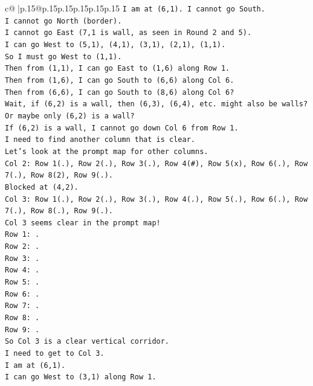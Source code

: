 \documentclass{article}
\begin{document}
{\begin{supertabular}{c@{$\;$}|p{.15\linewidth}@{}p{.15\linewidth}p{.15\linewidth}p{.15\linewidth}p{.15\linewidth}p{.15\linewidth}}
{{{\texttt{I am at (6,1). I cannot go South.} \\
\texttt{I cannot go North (border).} \\
\texttt{I cannot go East (7,1 is wall, as seen in Round 2 and 5).} \\
\texttt{I can go West to (5,1), (4,1), (3,1), (2,1), (1,1).} \\
\texttt{So I must go West to (1,1).} \\
\texttt{Then from (1,1), I can go East to (1,6) along Row 1.} \\
\texttt{Then from (1,6), I can go South to (6,6) along Col 6.} \\
\texttt{Then from (6,6), I can go South to (8,6) along Col 6?} \\
\texttt{Wait, if (6,2) is a wall, then (6,3), (6,4), etc. might also be walls?} \\
\texttt{Or maybe only (6,2) is a wall?} \\
\texttt{If (6,2) is a wall, I cannot go down Col 6 from Row 1.} \\
\texttt{I need to find another column that is clear.} \\
\texttt{Let's look at the prompt map for other columns.} \\
\texttt{Col 2: Row 1(.), Row 2(.), Row 3(.), Row 4(\#), Row 5(x), Row 6(.), Row 7(.), Row 8(2), Row 9(.).} \\
\texttt{Blocked at (4,2).} \\
\texttt{Col 3: Row 1(.), Row 2(.), Row 3(.), Row 4(.), Row 5(.), Row 6(.), Row 7(.), Row 8(.), Row 9(.).} \\
\texttt{Col 3 seems clear in the prompt map!} \\
\texttt{Row 1: .} \\
\texttt{Row 2: .} \\
\texttt{Row 3: .} \\
\texttt{Row 4: .} \\
\texttt{Row 5: .} \\
\texttt{Row 6: .} \\
\texttt{Row 7: .} \\
\texttt{Row 8: .} \\
\texttt{Row 9: .} \\
\texttt{So Col 3 is a clear vertical corridor.} \\
\texttt{I need to get to Col 3.} \\
\texttt{I am at (6,1).} \\
\texttt{I can go West to (3,1) along Row 1.} \\
}}}
\end{supertabular}}
\end{document}
